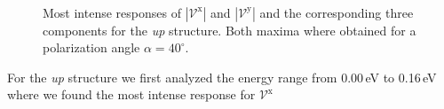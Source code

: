 \documentclass[prb,11pt,tightenlines,twocolumn,aps]{revtex4-1}
\begin{document}
\begin{figure}[t]
    \centering
    \\
    \caption{Most intense responses of $|\mathcal{V}^{\mathrm{x}}|$ and
    $|\mathcal{V}^{\mathrm{y}}|$ and the corresponding three components for the
    \emph{up} structure. Both maxima where obtained for a polarization
    angle $\alpha=40^{\circ}$. }
    \label{fig:up-vab-comp-rtp-1}
\end{figure}
For the \emph{up} structure we first analyzed the energy range from 0.00\,eV to
0.16\,eV where we found the most intense response for $\mathcal{V}^{\mathrm{x}}$
\end{document}
